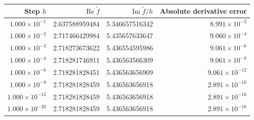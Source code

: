 \begin{tabular}{rrrr}\toprule
Step $h$ & $\operatorname{Re}\widetilde f$ & $\operatorname{Im}\widetilde f/h$ & Absolute derivative error \\ \midrule
$1.000\times10^{-1}$ & 2.637588959484 & 5.346657516342 & $8.991\times10^{-2}$ \\
$1.000\times10^{-2}$ & 2.717466429984 & 5.435657633647 & $9.060\times10^{-4}$ \\
$1.000\times10^{-3}$ & 2.718273673622 & 5.436554595986 & $9.061\times10^{-6}$ \\
$1.000\times10^{-4}$ & 2.718281746911 & 5.436563566309 & $9.061\times10^{-8}$ \\
$1.000\times10^{-6}$ & 2.718281828451 & 5.436563656909 & $9.061\times10^{-12}$ \\
$1.000\times10^{-8}$ & 2.718281828459 & 5.436563656918 & $2.891\times10^{-16}$ \\
$1.000\times10^{-12}$ & 2.718281828459 & 5.436563656918 & $2.891\times10^{-16}$ \\
$1.000\times10^{-20}$ & 2.718281828459 & 5.436563656918 & $2.891\times10^{-16}$ \\
\bottomrule\end{tabular}
